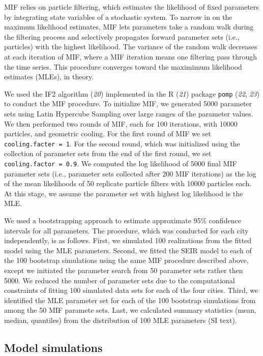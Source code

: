 \documentclass[3p]{elsarticle} %
\begin{document}
MIF relies on particle filtering, which estimates the likelihood of
fixed parameters by integrating state variables of a stochastic system.
To narrow in on the maximum likelihood estimates, MIF lets parameters
take a random walk during the filtering process and selectively
propagates forward parameter sets (i.e., particles) with the highest
likelihood. The variance of the random walk decreases at each iteration
of MIF, where a MIF iteration means one filtering pass through the time
series. This procedure converges toward the maximimum likelihood
estimates (MLEs), in theory.

We used the IF2 algorithm (\emph{20}) implemented in the R (\emph{21})
package \texttt{pomp} (\emph{22}, \emph{23}) to conduct the MIF
procedure. To initialize MIF, we generated 5000 parameter sets using
Latin Hypercube Sampling over large ranges of the parameter values. We
then performed two rounds of MIF, each for 100 iterations, with 10000
particles, and geometric cooling. For the first round of MIF we set
\texttt{cooling.facter\ =\ 1}. For the second round, which was
initialized using the collection of parameter sets from the end of the
first round, we set \texttt{cooling.factor\ =\ 0.9}. We computed the log
likelihood of 5000 final MIF parameter sets (i.e., parameter sets
collected after 200 MIF iterations) as the log of the mean likelihoods
of 50 replicate particle filters with 10000 particles each. At this
stage, we assume the parameter set with highest log likelihood is the
MLE.

We used a bootstrapping approach to estimate approximate 95\% confidence
intervals for all parameters. The procedure, which was conducted for
each city independently, is as follows. First, we simulated 100
realizations from the fitted model using the MLE parameters. Second, we
fitted the SEIR model to each of the 100 bootstrap simulations using the
same MIF procedure described above, except we initiated the parameter
search from 50 parameter sets rather then 5000. We reduced the number of
parameter sets due to the computational constraints of fitting 100
simulated data sets for each of the four cities. Third, we identified
the MLE parameter set for each of the 100 bootstrap simulations from
among the 50 MIF paramete sets. Last, we calculated summary statistics
(mean, median, quantiles) from the distribution of 100 MLE parameters
(SI text).

\subsection{Model simulations}\label{model-simulations}
\end{document}
